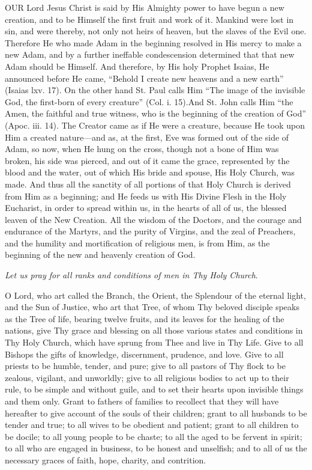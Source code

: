 OUR Lord Jesus Christ
is said by His Almighty power to have begun a new creation, and to be
Himself the first fruit and work of it. Mankind were lost in sin, and
were thereby, not only not heirs of heaven, but the slaves of the Evil
one. Therefore He who made Adam in the beginning resolved in His mercy
to make a new Adam, and by a further ineffable condescension determined
that that new Adam should be Himself. And therefore, by His holy Prophet
Isaias, He announced before He came, ``Behold I create new heavens and a
new earth'' (Isaias lxv. 17). On the other hand St. Paul calls Him ``The
image of the invisible God, the first-born of every creature'' (Col. i.
15).\emph{}And St. John calls Him ``the Amen, the faithful and true
witness, who is the beginning of the creation of God'' (Apoc. iii. 14).
The Creator came as if He were a creature, because He took upon Him a
created nature—and as, at the first, Eve was formed out of the side of
Adam, so now, when He hung on the cross, though not a bone of Him was
broken, his side was pierced, and out of it came the grace, represented
by the blood and the water, out of which His bride and spouse, His Holy
Church, was made. And thus all the sanctity of all portions of that Holy
Church is derived from Him as a beginning; and He feeds us with
His Divine Flesh in the Holy Eucharist, in order to spread within us, in
the hearts of all of us, the blessed leaven of the New Creation. All the
wisdom of the Doctors, and the courage and endurance of the Martyrs, and
the purity of Virgins, and the zeal of Preachers, and the humility and
mortification of religious men, is from Him, as the beginning of the new
and heavenly creation of God.

\emph{Let us pray for all ranks and
conditions of men in Thy Holy Church}.

O Lord, who art called the
Branch, the Orient, the Splendour of the eternal light, and the Sun of
Justice, who art that Tree, of whom Thy beloved disciple speaks as the
Tree of life, bearing twelve fruits, and its leaves for the healing of
the nations, give Thy grace and blessing on all those various states and
conditions in Thy Holy Church, which have sprung from Thee and live in
Thy Life. Give to all Bishops the gifts of knowledge, discernment,
prudence, and love. Give to all priests to be humble, tender, and pure;
give to all pastors of Thy flock to be zealous, vigilant, and unworldly;
give to all religious bodies to act up to their rule, to be simple and
without guile, and to set their hearts upon invisible things and them
only. Grant to fathers of families to recollect that they will have
hereafter to give account of the souls of their children; grant to all
husbands to be tender and true; to all wives to be obedient and patient;
grant to all children to be docile; to all young people to be
chaste; to all the aged to be fervent in spirit; to all who are engaged
in business, to be honest and unselfish; and to all of us the necessary
graces of faith, hope, charity, and contrition.

